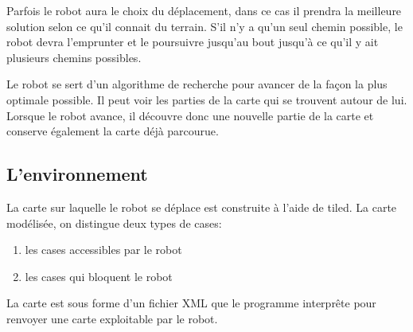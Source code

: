 \documentclass[a4paper 12pts]{article}
\begin{document}
Parfois le robot aura le choix du déplacement, dans ce cas il prendra la meilleure solution selon ce qu'il connait du terrain. S'il n'y a qu'un seul chemin possible, le robot devra l'emprunter et le poursuivre jusqu'au bout jusqu'à ce qu'il y ait plusieurs chemins possibles.

Le robot se sert d'un algorithme de recherche pour avancer de la façon la plus optimale possible. Il peut voir les parties de la carte qui se trouvent autour de lui. Lorsque le robot avance, il découvre donc une nouvelle partie de la carte et conserve également la carte déjà parcourue.

\subsection{L'environnement}
La carte sur laquelle le robot se déplace est construite à l'aide de tiled. La carte modélisée, on distingue deux types de cases:

\begin{enumerate}
	\item les cases accessibles par le robot
	\item les cases qui bloquent le robot
\end{enumerate}

La carte est sous forme d'un fichier XML que le programme interprête pour renvoyer une carte exploitable par le robot.
\end{document}
